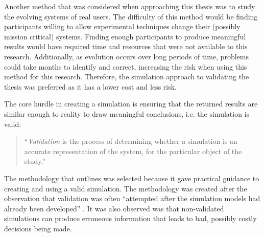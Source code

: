 Another method that was considered when approaching this thesis was to study the evolving systems of real users.
The difficulty of this method would be finding participants willing to allow experimental techniques change their (possibly mission critical) systems.
Finding enough participants to produce meaningful results would have required time and resources that were not available to this research.
Additionally, as evolution occurs over long periods of time, problems could take months to identify and correct, increasing the risk when using this method for this research. 
Therefore, the simulation approach to validating the thesis was preferred as it has a lower cost and less risk.

The core hurdle in creating a simulation is ensuring that the returned results are similar enough to reality to draw meaningful conclusions, i.e. the simulation is valid:
\begin{quotation}
``\textit{Validation} is the process of determining whether a simulation is an accurate representation of the system, for the particular object of the study.'' \citep{Law2005}
\end{quotation}

The methodology that \cite{Law2005} outlines was selected because it gave practical guidance to creating and using a valid simulation.
The methodology was created after the observation that validation was often ``attempted after the simulation models had already been developed'' \citep{Law2005}.
It was also observed was that non-validated simulations can produce erroneous information that leads to bad, possibly costly decisions being made.

